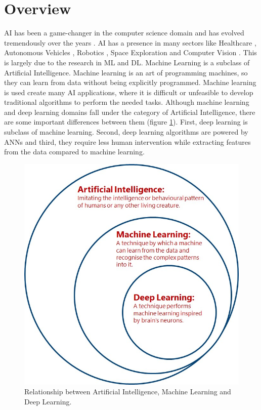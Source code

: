 \justifying
\setlength{\parskip}{1em}


\section{Overview}

\ac{AI} has been a game-changer in the computer science domain and has evolved tremendously over the years \cite{goodfellow2017deep}. \ac{AI} has a presence in many sectors like Healthcare \cite{Yu.2018}, Autonomous Vehicles \cite{Yurtsever_2020}, Robotics \cite{10.1007/978-3-642-82153-0_2}, Space Exploration \cite{Girimonte2007} and Computer Vision \cite{2020}. This is largely due to the research in \ac{ML} and \ac{DL}. Machine Learning is a subclass of Artificial Intelligence. Machine learning is an art of programming machines, so they can learn from data without being explicitly programmed. Machine learning is used create many \ac{AI} applications, where it is difficult or unfeasible to develop traditional algorithms to perform the needed tasks. Although machine learning and deep learning domains fall under the category of Artificial Intelligence, there are some important differences between them (figure \ref{fig:deepLearningSubset}). First, deep learning is subclass of machine learning. Second, deep learning algorithms are powered by \acp{ANN} and third, they require less human intervention while extracting features from the data compared to machine learning.


\begin{figure}[H]
        \begin{center}
 	    \includegraphics[scale=0.48]{images/Introduction/deeplearningsubset.jpg}
	    \caption[Relationship between Artificial Intelligence, Machine Learning and Deep Learning.]{Relationship between Artificial Intelligence, Machine Learning and Deep Learning.}
	    \label{fig:deepLearningSubset}
	    \end{center}
\end{figure}


